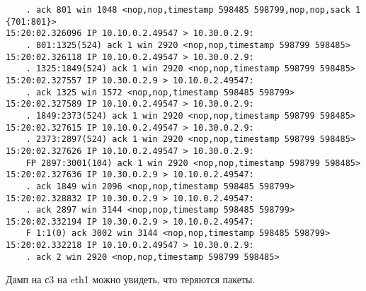 \documentclass[a4paper,12pt]{article}
\begin{document}
\begin{Verbatim}
    . ack 801 win 1048 <nop,nop,timestamp 598485 598799,nop,nop,sack 1 {701:801}>
15:20:02.326096 IP 10.10.0.2.49547 > 10.30.0.2.9: 
    . 801:1325(524) ack 1 win 2920 <nop,nop,timestamp 598799 598485>
15:20:02.326118 IP 10.10.0.2.49547 > 10.30.0.2.9: 
    . 1325:1849(524) ack 1 win 2920 <nop,nop,timestamp 598799 598485>
15:20:02.327557 IP 10.30.0.2.9 > 10.10.0.2.49547: 
    . ack 1325 win 1572 <nop,nop,timestamp 598485 598799>
15:20:02.327589 IP 10.10.0.2.49547 > 10.30.0.2.9: 
    . 1849:2373(524) ack 1 win 2920 <nop,nop,timestamp 598799 598485>
15:20:02.327615 IP 10.10.0.2.49547 > 10.30.0.2.9: 
    . 2373:2897(524) ack 1 win 2920 <nop,nop,timestamp 598799 598485>
15:20:02.327626 IP 10.10.0.2.49547 > 10.30.0.2.9: 
    FP 2897:3001(104) ack 1 win 2920 <nop,nop,timestamp 598799 598485>
15:20:02.327636 IP 10.30.0.2.9 > 10.10.0.2.49547: 
    . ack 1849 win 2096 <nop,nop,timestamp 598485 598799>
15:20:02.328832 IP 10.30.0.2.9 > 10.10.0.2.49547: 
    . ack 2897 win 3144 <nop,nop,timestamp 598485 598799>
15:20:02.332194 IP 10.30.0.2.9 > 10.10.0.2.49547: 
    F 1:1(0) ack 3002 win 3144 <nop,nop,timestamp 598485 598799>
15:20:02.332218 IP 10.10.0.2.49547 > 10.30.0.2.9: 
    . ack 2 win 2920 <nop,nop,timestamp 598799 598485>
\end{Verbatim}

Дамп на с3 на eth1 можно увидеть, что теряются пакеты.
\end{document}
